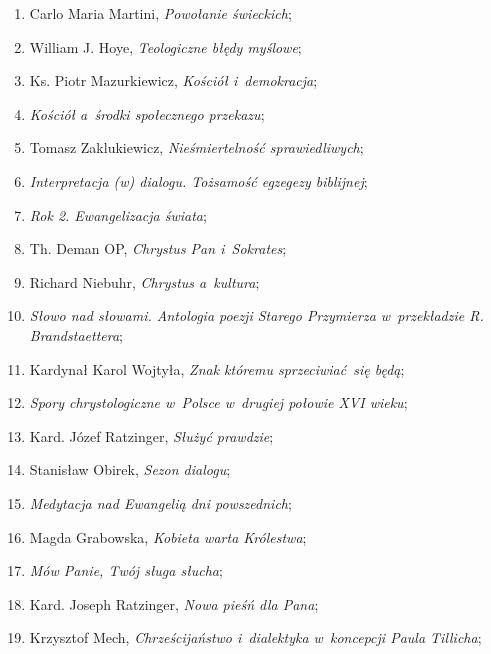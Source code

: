 \documentclass[a4paper,11pt]{article}
\begin{document}
\begin{enumerate}
\item Carlo Maria Martini, \textit{Powołanie świeckich};

\item William J. Hoye, \textit{Teologiczne błędy myślowe};

\item Ks. Piotr Mazurkiewicz, \textit{Kościół i~demokracja};

\item \textit{Kościół a~środki społecznego przekazu};

\item Tomasz Zaklukiewicz, \textit{Nieśmiertelność sprawiedliwych};

\item \textit{Interpretacja (w) dialogu. Tożsamość egzegezy biblijnej};

\item \textit{Rok 2. Ewangelizacja świata};

\item Th. Deman OP, \textit{Chrystus Pan i~Sokrates};

\item Richard Niebuhr, \textit{Chrystus a~kultura};

\item \textit{Słowo nad słowami. Antologia poezji Starego Przymierza
    w~przekładzie R. Brandstaettera};

\item Kardynał Karol Wojtyła, \textit{Znak któremu sprzeciwiać~się będą};

\item \textit{Spory chrystologiczne w~Polsce w~drugiej połowie XVI wieku};

\item Kard. Józef Ratzinger, \textit{Służyć prawdzie};

\item Stanisław Obirek, \textit{Sezon dialogu};

\item \textit{Medytacja nad Ewangelią dni powszednich};

\item Magda Grabowska, \textit{Kobieta warta Królestwa};

\item \textit{Mów Panie, Twój sługa słucha};

\item Kard. Joseph Ratzinger, \textit{Nowa pieśń dla Pana};

\item Krzysztof Mech, \textit{Chrześcijaństwo i~dialektyka w~koncepcji
    Paula Tillicha};


\end{enumerate}
\end{document}
